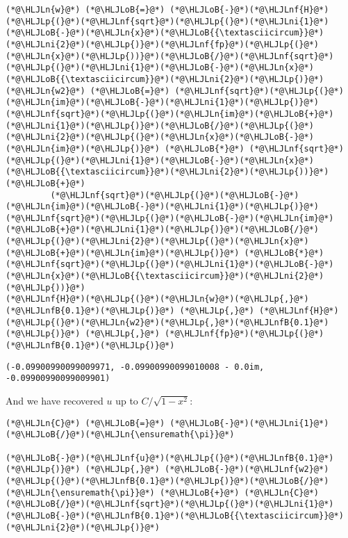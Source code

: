 \documentclass[12pt,landscape]{article}
\newcommand{\HLJLn}[1]{#1}
\newcommand{\HLJLnf}[1]{\textcolor[RGB]{66,102,213}{#1}}
\newcommand{\HLJLnfB}[1]{\textcolor[RGB]{59,151,46}{#1}}
\newcommand{\HLJLni}[1]{\textcolor[RGB]{59,151,46}{#1}}
\newcommand{\HLJLoB}[1]{\textcolor[RGB]{102,102,102}{\textbf{#1}}}
\newcommand{\HLJLp}[1]{#1}
\begin{document}
{\begin{lstlisting}
(*@\HLJLn{w}@*) (*@\HLJLoB{=}@*) (*@\HLJLoB{-}@*)(*@\HLJLnf{H}@*)(*@\HLJLp{(}@*)(*@\HLJLnf{sqrt}@*)(*@\HLJLp{(}@*)(*@\HLJLni{1}@*)(*@\HLJLoB{-}@*)(*@\HLJLn{x}@*)(*@\HLJLoB{{\textasciicircum}}@*)(*@\HLJLni{2}@*)(*@\HLJLp{)}@*)(*@\HLJLnf{fp}@*)(*@\HLJLp{(}@*)(*@\HLJLn{x}@*)(*@\HLJLp{))}@*)(*@\HLJLoB{/}@*)(*@\HLJLnf{sqrt}@*)(*@\HLJLp{(}@*)(*@\HLJLni{1}@*)(*@\HLJLoB{-}@*)(*@\HLJLn{x}@*)(*@\HLJLoB{{\textasciicircum}}@*)(*@\HLJLni{2}@*)(*@\HLJLp{)}@*)
(*@\HLJLn{w2}@*) (*@\HLJLoB{=}@*) (*@\HLJLnf{sqrt}@*)(*@\HLJLp{(}@*)(*@\HLJLn{im}@*)(*@\HLJLoB{-}@*)(*@\HLJLni{1}@*)(*@\HLJLp{)}@*)(*@\HLJLnf{sqrt}@*)(*@\HLJLp{(}@*)(*@\HLJLn{im}@*)(*@\HLJLoB{+}@*)(*@\HLJLni{1}@*)(*@\HLJLp{)}@*)(*@\HLJLoB{/}@*)(*@\HLJLp{(}@*)(*@\HLJLni{2}@*)(*@\HLJLp{(}@*)(*@\HLJLn{x}@*)(*@\HLJLoB{-}@*)(*@\HLJLn{im}@*)(*@\HLJLp{)}@*) (*@\HLJLoB{*}@*) (*@\HLJLnf{sqrt}@*)(*@\HLJLp{(}@*)(*@\HLJLni{1}@*)(*@\HLJLoB{-}@*)(*@\HLJLn{x}@*)(*@\HLJLoB{{\textasciicircum}}@*)(*@\HLJLni{2}@*)(*@\HLJLp{))}@*) (*@\HLJLoB{+}@*)
         (*@\HLJLnf{sqrt}@*)(*@\HLJLp{(}@*)(*@\HLJLoB{-}@*)(*@\HLJLn{im}@*)(*@\HLJLoB{-}@*)(*@\HLJLni{1}@*)(*@\HLJLp{)}@*)(*@\HLJLnf{sqrt}@*)(*@\HLJLp{(}@*)(*@\HLJLoB{-}@*)(*@\HLJLn{im}@*)(*@\HLJLoB{+}@*)(*@\HLJLni{1}@*)(*@\HLJLp{)}@*)(*@\HLJLoB{/}@*)(*@\HLJLp{(}@*)(*@\HLJLni{2}@*)(*@\HLJLp{(}@*)(*@\HLJLn{x}@*)(*@\HLJLoB{+}@*)(*@\HLJLn{im}@*)(*@\HLJLp{)}@*) (*@\HLJLoB{*}@*) (*@\HLJLnf{sqrt}@*)(*@\HLJLp{(}@*)(*@\HLJLni{1}@*)(*@\HLJLoB{-}@*)(*@\HLJLn{x}@*)(*@\HLJLoB{{\textasciicircum}}@*)(*@\HLJLni{2}@*)(*@\HLJLp{))}@*)
(*@\HLJLnf{H}@*)(*@\HLJLp{(}@*)(*@\HLJLn{w}@*)(*@\HLJLp{,}@*)(*@\HLJLnfB{0.1}@*)(*@\HLJLp{)}@*) (*@\HLJLp{,}@*) (*@\HLJLnf{H}@*)(*@\HLJLp{(}@*)(*@\HLJLn{w2}@*)(*@\HLJLp{,}@*)(*@\HLJLnfB{0.1}@*)(*@\HLJLp{)}@*) (*@\HLJLp{,}@*) (*@\HLJLnf{fp}@*)(*@\HLJLp{(}@*)(*@\HLJLnfB{0.1}@*)(*@\HLJLp{)}@*)
\end{lstlisting}

\begin{lstlisting}
(-0.09900990099009971, -0.09900990099010008 - 0.0im, -0.09900990099009901)
\end{lstlisting}


And we have recovered $u$ up to $C/\sqrt{1-x^2}$:


\begin{lstlisting}
(*@\HLJLn{C}@*) (*@\HLJLoB{=}@*) (*@\HLJLoB{-}@*)(*@\HLJLni{1}@*)(*@\HLJLoB{/}@*)(*@\HLJLn{\ensuremath{\pi}}@*)

(*@\HLJLoB{-}@*)(*@\HLJLnf{u}@*)(*@\HLJLp{(}@*)(*@\HLJLnfB{0.1}@*)(*@\HLJLp{)}@*) (*@\HLJLp{,}@*) (*@\HLJLoB{-}@*)(*@\HLJLnf{w2}@*)(*@\HLJLp{(}@*)(*@\HLJLnfB{0.1}@*)(*@\HLJLp{)}@*)(*@\HLJLoB{/}@*)(*@\HLJLn{\ensuremath{\pi}}@*) (*@\HLJLoB{+}@*) (*@\HLJLn{C}@*)(*@\HLJLoB{/}@*)(*@\HLJLnf{sqrt}@*)(*@\HLJLp{(}@*)(*@\HLJLni{1}@*)(*@\HLJLoB{-}@*)(*@\HLJLnfB{0.1}@*)(*@\HLJLoB{{\textasciicircum}}@*)(*@\HLJLni{2}@*)(*@\HLJLp{)}@*)
\end{lstlisting}

}
\end{document}
